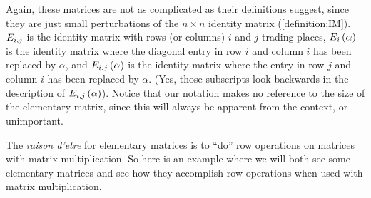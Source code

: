 \documentclass{ximera}
\begin{document}
Again, these matrices are not as complicated as their definitions
suggest, since they are just small perturbations of the $n\times n$
identity matrix (\ref{definition:IM}).  $E_{i,j}$ is the
identity matrix with rows (or columns) $i$ and $j$ trading places,
$E_{i}\left(\alpha\right)$ is the identity matrix where the diagonal entry
in row $i$ and column $i$ has been replaced by $\alpha$, and
$E_{i,j}\left(\alpha\right)$ is the identity matrix where the entry in row
$j$ and column $i$ has been replaced by $\alpha$. (Yes, those
subscripts look backwards in the description of
$E_{i,j}\left(\alpha\right)$).  Notice that our notation makes no
reference to the size of the elementary matrix, since this will always
be apparent from the context, or unimportant.

The \textit{raison d'etre} for elementary matrices is to ``do'' row
operations on matrices with matrix multiplication.  So here is an
example where we will both see some elementary matrices and see how
they accomplish row operations when used with matrix multiplication.
\end{document}
